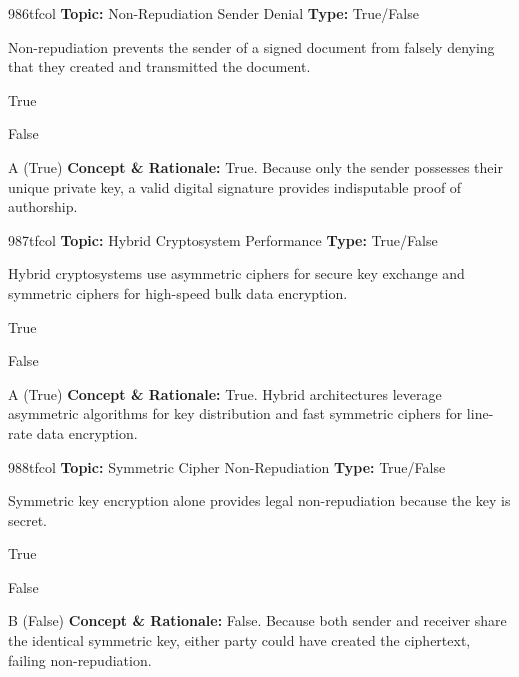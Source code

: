 \begin{qcard}{986}{tfcol}
\textcolor{darkslate!75}{\small\textbf{Topic:} Non-Repudiation Sender Denial \hfill \textbf{Type:} True/False}\vspace{0.4em}\par
Non-repudiation prevents the sender of a signed document from falsely denying that they created and transmitted the document.
\begin{qoptions}
\item True
\item False
\end{qoptions}
\end{qcard}
\nopagebreak
\begin{explainbox}{A (True)}
\textbf{Concept \& Rationale:} True. Because only the sender possesses their unique private key, a valid digital signature provides indisputable proof of authorship.
\end{explainbox}

\begin{qcard}{987}{tfcol}
\textcolor{darkslate!75}{\small\textbf{Topic:} Hybrid Cryptosystem Performance \hfill \textbf{Type:} True/False}\vspace{0.4em}\par
Hybrid cryptosystems use asymmetric ciphers for secure key exchange and symmetric ciphers for high-speed bulk data encryption.
\begin{qoptions}
\item True
\item False
\end{qoptions}
\end{qcard}
\nopagebreak
\begin{explainbox}{A (True)}
\textbf{Concept \& Rationale:} True. Hybrid architectures leverage asymmetric algorithms for key distribution and fast symmetric ciphers for line-rate data encryption.
\end{explainbox}

\begin{qcard}{988}{tfcol}
\textcolor{darkslate!75}{\small\textbf{Topic:} Symmetric Cipher Non-Repudiation \hfill \textbf{Type:} True/False}\vspace{0.4em}\par
Symmetric key encryption alone provides legal non-repudiation because the key is secret.
\begin{qoptions}
\item True
\item False
\end{qoptions}
\end{qcard}
\nopagebreak
\begin{explainbox}{B (False)}
\textbf{Concept \& Rationale:} False. Because both sender and receiver share the identical symmetric key, either party could have created the ciphertext, failing non-repudiation.
\end{explainbox}

